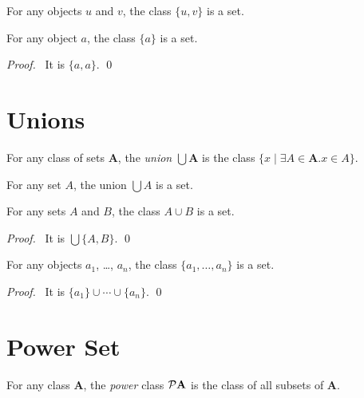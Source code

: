 \begin{axiom}
    For any objects $u$ and $v$, the class $\{ u, v \}$ is a set.
\end{axiom}

\begin{theorem}
    For any object $a$, the class $\{ a \}$ is a set.
\end{theorem}

\begin{proof}
    \pf\ It is $\{ a, a \}$. \qed
\end{proof}

\section{Unions}

\begin{definition}[Union]
    For any class of sets $\mathbf{A}$, the \emph{union} $\bigcup \mathbf{A}$
    is the class $\{x \mid \exists A \in \mathbf{A}. x \in A \}$.
\end{definition}

\begin{axiom}
    For any set $A$, the union $\bigcup A$ is a set.
\end{axiom}

\begin{theorem}
    \label{theorem:union}
    For any sets $A$ and $B$, the class $A \cup B$ is a set.
\end{theorem}

\begin{proof}
    \pf\ It is $\bigcup \{ A, B \}$. \qed
\end{proof}

\begin{theorems}
    For any objects $a_1$, \ldots, $a_n$, the class $\{ a_1, \ldots, a_n \}$
    is a set.
\end{theorems}

\begin{proof}
    \pf\ It is $\{a_1\} \cup \cdots \cup \{a_n\}$. \qed
\end{proof}

\section{Power Set}

\begin{definition}
    For any class $\mathbf{A}$, the \emph{power} class $\mathcal{P} \mathbf{A}$
    is the class of all subsets of $\mathbf{A}$.
\end{definition}

